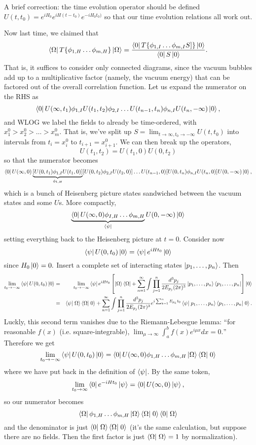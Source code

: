 A brief correction: the time evolution operator should be defined
$U(t,t_0)=e^{iH_0}e^{iH(t-t_0)}e^{-iH_0 t_0)}$ so that our time evolution relations all work out.

Now last time, we claimed that
$$\left< \Omega \right|T\{\phi_{1,H}\ldots \phi_{m,H}\}\left| \Omega \right>=\frac{\left< 0 \right|T \{\phi_{1,I}\ldots \phi_{m,I}S]\}\left| 0 \right>}{\left< 0 \right|S\left| 0 \right>}.$$
That is, it suffices to consider only connected diagrams, since the vacuum bubbles add up to a multiplicative factor (namely, the vacuum energy) that can be factored out of the overall correlation function.
Let us expand the numerator on the RHS as
$$\left< 0 \right|U(\infty, t_1) \phi_{1,I} U(t_1,t_2)\phi_{2,I} \ldots U(t_{n-1},t_n)\phi_{n,I} U(t_n,-\infty)\left| 0 \right>,$$
and WLOG we label the fields to already be time-ordered, with $x_1^0 > x_2^0 > \ldots > x_m^0$. That is, we've split up $S=\lim_{t\to \infty, t_0\to-\infty} U(t,t_0)$ into intervals from $t_i=x_i^0$ to $t_{i+1}=x_{i+1}^0$. We can then break up the operators,
$$U(t_1,t_2)=U(t_1,0)U(0,t_2)$$ so that the numerator becomes
$$\left< 0 \right|U(\infty, 0) \underbrace{[U(0,t_1)\phi_{1,I} U(t_1,0)]}_{\phi_{1,H}} [U(0,t_2)\phi_{2,I} U(t_2,0)]\ldots U(t_{n-1},0)[U(0,t_n)\phi_{n,I} U(t_n,0)]U(0,-\infty)\left| 0 \right>,$$
which is a bunch of Heisenberg picture states sandwiched between the vacuum states and some $U$s.
More compactly,
$$\underbrace{\left< 0 \right|U(\infty,0)\phi_{I,H}\ldots \phi_{m,H}}_{\left< \psi \right|}U(0,-\infty)\left| 0 \right>$$
setting everything back to the Heisenberg picture at $t=0$. Consider now
$$\left< \psi \right|U(0,t_0)\left| 0 \right>=\left< \psi \right|e^{iHt_0}\left| 0 \right>$$
since $H_0\left| 0 \right>=0.$ Insert a complete set of interacting states $\left| p_1,\ldots, p_n \right>$. Then 
\begin{eqnarray*}
\lim_{t_0\to-\infty} \bra{\psi}U(0,t_0)\ket{0}&=&
\lim_{t_0\to-\infty}\bra{\psi}e^{iHt_0}\left[\ket{\Omega}\bra{\Omega}+\sum_{n=1}^\infty \int  \prod_{j=1}^n \frac{d^3p_j}{2E_{p_j}(2\pi)^3}\ket{p_1,\ldots,p_n}\bra{p_1,\ldots,p_n}\right]\ket{0}\\
&=&\braket{\psi}{\Omega}\braket{\Omega}{0}+
\sum_{n=1}^\infty \int  \prod_{j=1}^n \frac{d^3p_j}{2E_{p_j}(2\pi)^3} e^{i\sum_{k=1}^n E_{p_k} t_0}\braket{\psi}{p_1,\ldots,p_n}\braket{p_1,\ldots,p_n}{0}.
\end{eqnarray*}
Luckly, this second term vanishes due to the Riemann-Lebesgue lemma: ``for reasonable $f(x)$ (i.e. square-integrable), $\lim_{\mu\to\infty} \int_a^b f(x)e^{i\mu x}dx=0.$'' Therefore we get
$$\lim_{t_0\to-\infty} \bra{\psi}U(0,t_0)\ket{0}=\bra{0}U(\infty,0)\phi_{1,H}\ldots \phi_{m,H}\ket{\Omega}\braket{\Omega}{0}$$
where we have put back in the definition of $\left< \psi \right|$. By the same token,
$$\lim_{t_0\to\infty}\left< 0 \right|e^{-iHt_0}\left| \psi \right>=\left< 0 \right|U(\infty,0)\left| \psi \right>,$$
so our numerator becomes
$$\bra{\Omega}\phi_{1,H}\ldots \phi_{m,H}\ket{\Omega}\braket{\Omega}{0}\braket{0}{\Omega}$$
and the denominator is just $\braket{0}{\Omega}\braket{\Omega}{0}$ (it's the same calculation, but suppose there are no fields. Then the first factor is just $\braket{\Omega}{\Omega}=1$ by normalization).

